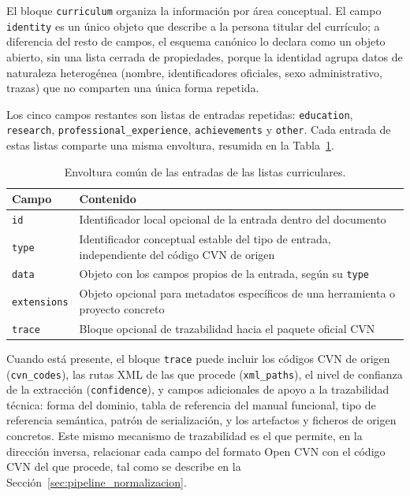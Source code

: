 El bloque \texttt{curriculum} organiza la información por área conceptual.
El campo \texttt{identity} es un único objeto que describe a la persona
titular del currículo; a diferencia del resto de campos, el esquema
canónico lo declara como un objeto abierto, sin una lista cerrada de
propiedades, porque la identidad agrupa datos de naturaleza heterogénea
(nombre, identificadores oficiales, sexo administrativo, trazas) que no
comparten una única forma repetida.

Los cinco campos restantes son listas de entradas repetidas:
\texttt{education}, \texttt{research}, \texttt{professional\_experience},
\texttt{achievements} y \texttt{other}. Cada entrada de estas listas
comparte una misma envoltura, resumida en la
Tabla~\ref{tab:anexo_formato_entrada}.

\begin{table}[htbp]
  \centering
  \footnotesize
  \renewcommand{\arraystretch}{1.45}
  \caption{Envoltura común de las entradas de las listas curriculares.}
  \label{tab:anexo_formato_entrada}
  \begin{tabular}{p{} p{}}
    \hline
    \textbf{Campo} & \textbf{Contenido} \\
    \hline
    \texttt{id} & Identificador local opcional de la entrada dentro del documento \\
    \texttt{type} & Identificador conceptual estable del tipo de entrada, independiente del código CVN de origen \\
    \texttt{data} & Objeto con los campos propios de la entrada, según su \texttt{type} \\
    \texttt{extensions} & Objeto opcional para metadatos específicos de una herramienta o proyecto concreto \\
    \texttt{trace} & Bloque opcional de trazabilidad hacia el paquete oficial CVN \\
    \hline
  \end{tabular}
\end{table}

Cuando está presente, el bloque \texttt{trace} puede incluir los códigos CVN
de origen (\texttt{cvn\_codes}), las rutas XML de las que procede
(\texttt{xml\_paths}), el nivel de confianza de la extracción
(\texttt{confidence}), y campos adicionales de apoyo a la trazabilidad
técnica: forma del dominio, tabla de referencia del manual funcional,
tipo de referencia semántica, patrón de serialización, y los artefactos y
ficheros de origen concretos. Este mismo mecanismo de trazabilidad es el
que permite, en la dirección inversa, relacionar cada campo del formato
Open CVN con el código CVN del que procede, tal como se describe en la
Sección~\ref{sec:pipeline_normalizacion}.

